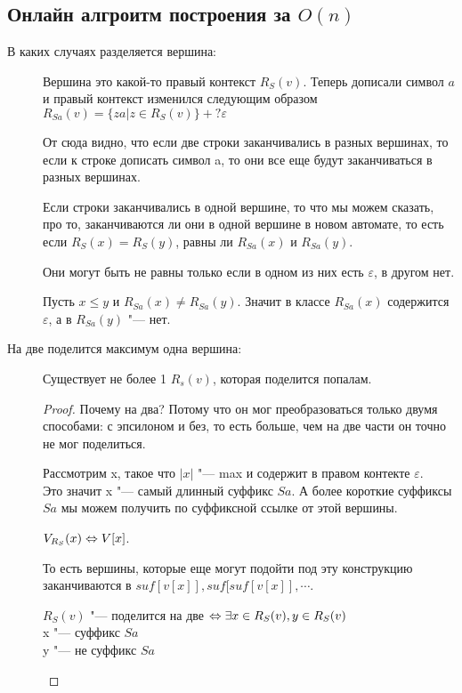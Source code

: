 \subsection{Онлайн алгроитм построения за $O(n)$}
    \begin{description}
    \item[В каких случаях разделяется вершина:]
    Вершина это какой-то правый контекст $R_{S}(v)$. Теперь дописали символ $a$ и 
    правый контекст изменился следующим образом $R_{Sa}(v) = \{za | z \in R_S(v)\} +? \varepsilon$
    
    От сюда видно, что если две строки заканчивались в разных вершинах, то если к строке дописать символ a, 
    то они все еще будут заканчиваться в разных вершинах.

    Если строки заканчивались в одной вершине, то что мы можем сказать, про то, заканчиваются ли они в
    одной вершине в новом автомате, то есть если $R_{S}(x) = R_{S}(y)$, равны ли $R_{Sa}(x)$ и $R_{Sa}(y)$.

    Они могут быть не равны только если в одном из них есть $\varepsilon$, в другом нет.
    
    Пусть $x \le y$ и $R_{Sa}(x) \ne R_{Sa}(y)$. Значит в классе $R_{Sa}(x)$  содержится $\varepsilon$, 
    а в $R_{Sa}(y)$ "--- нет.
    \item[На две поделится максимум одна вершина:]
    \begin{lemma}
    Существует не более 1 $R_s(v)$, которая поделится попалам.
    \end{lemma}
    \begin{proof}
    Почему на два? Потому что он мог преобразоваться только двумя способами: с эпсилоном и без, то 
    есть больше, чем на две части он точно не мог поделиться. 
    
    
    Рассмотрим x, такое что $|x|$ "--- max и содержит в правом контекте $\varepsilon$.\\
    Это значит x "--- самый длинный суффикс $Sa$. А более короткие суффиксы $Sa$ мы  можем получить 
    по суффиксной ссылке от этой вершины.

    $V_{R_S}(x) \Leftrightarrow V[x]$.

    То есть вершины, которые еще могут подойти под эту конструкцию заканчиваются в $suf[v[x]], suf[suf[v[x]], \cdots$.
    
    \begin{lemma}
    $R_S(v)$ "--- поделится на две $\Leftrightarrow\exists x \in R_S(v), y \in R_S(v)$\\
    x "--- суффикс $Sa$\\
    y "--- не суффикс $Sa$\\
    \end{lemma}
    

\end{proof}
\end{description}
